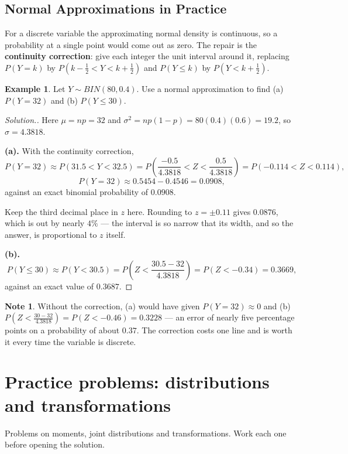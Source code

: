 \documentclass[12pt,a4paper]{report}
\theoremstyle{definition}
\newtheorem{example}[thm]{Example}
\newtheorem{note}[thm]{Note}
\theoremstyle{plain}
\newenvironment{solution}
  {\renewcommand{\qedsymbol}{}\begin{proof}[\textit{Solution}.]}
  {\end{proof}}
\begin{document}
\subsection{Normal Approximations in Practice}

For a discrete variable the approximating normal density is continuous, so a
probability at a single point would come out as zero. The repair is the
\textbf{continuity correction}: give each integer the unit interval around it,
replacing $P(Y=k)$ by $P\left(k-\frac12<Y<k+\frac12\right)$ and
$P(Y\leq k)$ by $P\left(Y<k+\frac12\right)$.

\begin{example}
Let $Y\sim BIN(80,0.4)$. Use a normal approximation to find (a) $P(Y=32)$ and
(b) $P(Y\leq30)$.
\end{example}

\begin{solution}
Here $\mu=np=32$ and $\sigma^2=np(1-p)=80(0.4)(0.6)=19.2$, so
$\sigma=4.3818$.

\textbf{(a).} With the continuity correction,
\[P(Y=32)\approx P\left(31.5<Y<32.5\right)
=P\left(\frac{-0.5}{4.3818}<Z<\frac{0.5}{4.3818}\right)
=P(-0.114<Z<0.114),\]
\[P(Y=32)\approx0.5454-0.4546=0.0908,\]
against an exact binomial probability of $0.0908$.

Keep the third decimal place in $z$ here. Rounding to $z=\pm0.11$ gives $0.0876$,
which is out by nearly $4\%$ --- the interval is so narrow that its width, and so
the answer, is proportional to $z$ itself.

\textbf{(b).}
\[P(Y\leq30)\approx P\left(Y<30.5\right)
=P\left(Z<\frac{30.5-32}{4.3818}\right)=P(Z<-0.34)=0.3669,\]
against an exact value of $0.3687$.
\end{solution}

\begin{note}
Without the correction, (a) would have given $P(Y=32)\approx0$ and (b)
$P\left(Z<\frac{30-32}{4.3818}\right)=P(Z<-0.46)=0.3228$ --- an error of nearly
five percentage points on a probability of about $0.37$. The correction costs one
line and is worth it every time the variable is discrete.
\end{note}

\section{Practice problems: distributions and transformations}

Problems on moments, joint distributions and transformations. Work each one
before opening the solution.
\end{document}
